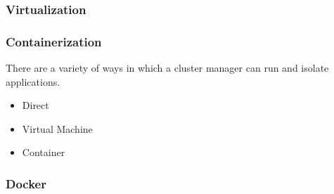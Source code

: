 \subsubsection{Virtualization}

\subsubsection{Containerization}

There are a variety of ways in which a cluster manager can run and isolate
applications.

\begin{itemize}
  \item Direct
  \item Virtual Machine
  \item Container
\end{itemize}

\subsubsection{Docker}
